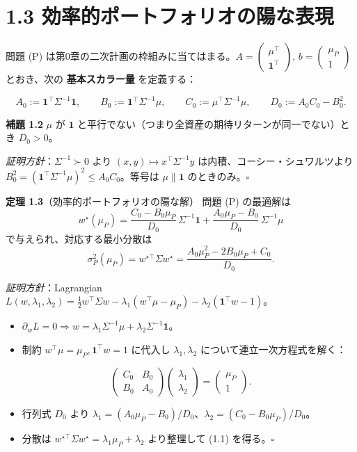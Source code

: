 \documentclass[11pt,a4paper]{report}
\begin{document}
\section{1.3 効率的ポートフォリオの陽な表現}

問題 (P) は第0章の二次計画の枠組みに当てはまる。$A = \begin{pmatrix} \mu^\top \\ \mathbf{1}^\top \end{pmatrix}$, $b = \begin{pmatrix} \mu_P \\ 1 \end{pmatrix}$ とおき、次の \textbf{基本スカラー量} を定義する：

\[ A_0 := \mathbf{1}^\top \Sigma^{-1} \mathbf{1}, \qquad B_0 := \mathbf{1}^\top \Sigma^{-1} \mu, \qquad C_0 := \mu^\top \Sigma^{-1} \mu, \qquad D_0 := A_0 C_0 - B_0^2. \]

\textbf{補題 1.2} $\mu$ が $\mathbf{1}$ と平行でない（つまり全資産の期待リターンが同一でない）とき $D_0 > 0$。

\emph{証明方針}：$\Sigma^{-1} \succ 0$ より $(x, y) \mapsto x^\top \Sigma^{-1} y$ は内積、コーシー・シュワルツより $B_0^2 = (\mathbf{1}^\top \Sigma^{-1} \mu)^2 \le A_0 C_0$。等号は $\mu \parallel \mathbf{1}$ のときのみ。$\square$

\textbf{定理 1.3}（効率的ポートフォリオの陽な解） 問題 (P) の最適解は \[ \boxed{\; w^\star(\mu_P) = \frac{C_0 - B_0 \mu_P}{D_0}\, \Sigma^{-1} \mathbf{1} + \frac{A_0 \mu_P - B_0}{D_0}\, \Sigma^{-1} \mu \;} \] で与えられ、対応する最小分散は \[ \sigma_P^2(\mu_P) = w^{\star\top} \Sigma w^\star = \frac{A_0 \mu_P^2 - 2 B_0 \mu_P + C_0}{D_0}. \tag{1.1} \]

\emph{証明方針}：Lagrangian $L(w, \lambda_1, \lambda_2) = \tfrac{1}{2} w^\top \Sigma w - \lambda_1 (w^\top \mu - \mu_P) - \lambda_2(\mathbf{1}^\top w - 1)$。
\begin{itemize}
\item $\partial_w L = 0 \Rightarrow w = \lambda_1 \Sigma^{-1}\mu + \lambda_2 \Sigma^{-1}\mathbf{1}$。
\item 制約 $w^\top \mu = \mu_P, \mathbf{1}^\top w = 1$ に代入し $\lambda_1, \lambda_2$ について連立一次方程式を解く：
\end{itemize}
\[ \begin{pmatrix} C_0 & B_0 \\ B_0 & A_0 \end{pmatrix} \begin{pmatrix} \lambda_1 \\ \lambda_2 \end{pmatrix} = \begin{pmatrix} \mu_P \\ 1 \end{pmatrix}. \]
\begin{itemize}
\item 行列式 $D_0$ より $\lambda_1 = (A_0 \mu_P - B_0)/D_0$、$\lambda_2 = (C_0 - B_0 \mu_P)/D_0$。
\item 分散は $w^{\star\top}\Sigma w^\star = \lambda_1 \mu_P + \lambda_2$ より整理して (1.1) を得る。$\square$
\end{itemize}
\end{document}
